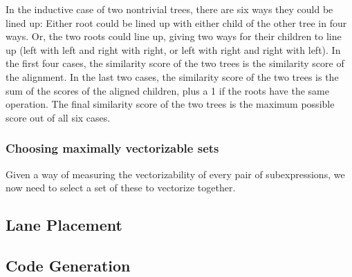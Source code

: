 In the inductive case of two nontrivial trees, there are six ways they could be lined up:
Either root could be lined up with either child of the other tree in four ways. 
Or, the two roots could line up, giving two ways for their children to line up (left with left and right with right, or left with right and right with left).
In the first four cases, the similarity score of the two trees is the similarity score of the alignment. 
In the last two cases, the similarity score of the two trees is the sum of the scores of the aligned children, plus a 1 if the roots have the same operation.
The final similarity score of the two trees is the maximum possible score out of all six cases. 
\subsubsection*{Choosing maximally vectorizable sets}
Given a way of measuring the vectorizability of every pair of subexpressions, we now need to select a set of these to vectorize together. 
\subsection{Lane Placement}
\subsection{Code Generation}
